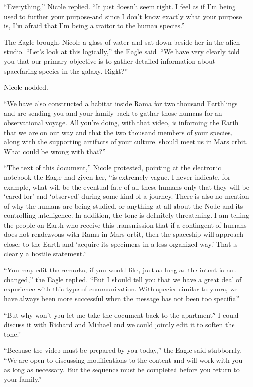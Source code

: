 \documentclass[]{article}
\begin{document}
{“Everything,” Nicole replied.  “It just doesn’t seem right.  I feel as if I’m being used to further your purpose-and since I don’t know exactly what your purpose is, I’m afraid that I’m being a traitor to the human species.”

The Eagle brought Nicole a glass of water and sat down beside her in the alien studio.  “Let’s look at this logically,” the Eagle said.  “We have very clearly told you that our primary objective is to gather detailed information about spacefaring species in the galaxy.  Right?”

Nicole nodded.

“We have also constructed a habitat inside Rama for two thousand Earthlings and are sending you and your family back to gather those humans for an observational voyage.  All you’re doing, with that video, is informing the Earth that we are on our way and that the two thousand members of your species, along with the supporting artifacts of your culture, should meet us in Mars orbit.  What could be wrong with that?”

“The text of this document,” Nicole protested, pointing at the electronic notebook the Eagle had given her, “is extremely vague.  I never indicate, for example, what will be the eventual fate of all these humans-only that they will be ‘cared for’ and ‘observed’ during some kind of a journey.  There is also no mention of why the humans are being studied, or anything at all about the Node and its controlling intelligence.  In addition, the tone is definitely threatening.  I am telling the people on Earth who receive this transmission that if a contingent of humans does not rendezvous with Rama in Mars orbit, then the spaceship will approach closer to the Earth and ‘acquire its specimens in a less organized way.’ That is clearly a hostile statement.”

“You may edit the remarks, if you would like, just as long as the intent is not changed,” the Eagle replied.  “But I should tell you that we have a great deal of experience with this type of communication.  With species similar to yours, we have always been more successful when the message has not been too specific.”

“But why won’t you let me take the document back to the apartment? I could discuss it with Richard and Michael and we could jointly edit it to soften the tone.”

“Because the video must be prepared by you today,” the Eagle said stubbornly.  “We are open to discussing modifications to the content and will work with you as long as necessary.  But the sequence must be completed before you return to your family.”

}
\end{document}
